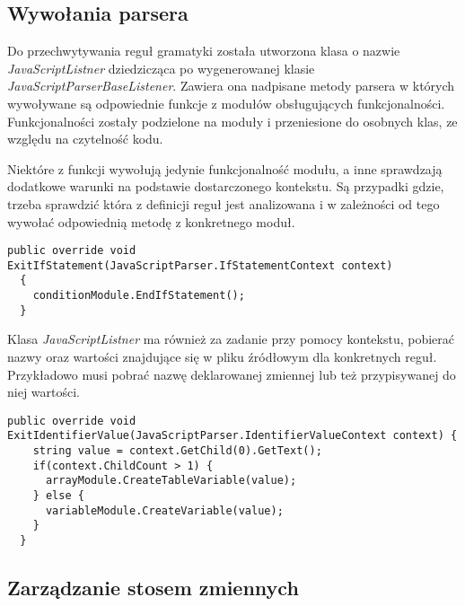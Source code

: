 \subsection{Wywołania parsera}

Do przechwytywania reguł gramatyki została utworzona klasa o nazwie \textit{JavaScriptListner} dziedzicząca po wygenerowanej klasie \textit{JavaScriptParserBaseListener}. Zawiera ona nadpisane metody parsera w których wywoływane są odpowiednie funkcje z modułów obsługujących funkcjonalności. Funkcjonalności zostały podzielone na moduły i przeniesione do osobnych klas, ze względu na czytelność kodu.
\par Niektóre z funkcji wywołują jedynie funkcjonalność modułu, a inne sprawdzają dodatkowe warunki na podstawie dostarczonego kontekstu. Są przypadki gdzie, trzeba sprawdzić która z definicji reguł jest analizowana i w zależności od tego wywołać odpowiednią metodę z konkretnego moduł.

\begin{lstlisting}[language=CSharp, caption=Przykład prostej funkcji listnera, label=alg:komListner1]
  public override void ExitIfStatement(JavaScriptParser.IfStatementContext context)
  {
    conditionModule.EndIfStatement();
  }
\end{lstlisting}

\par Klasa \textit{JavaScriptListner} ma również za zadanie przy pomocy kontekstu, pobierać nazwy oraz wartości znajdujące się w pliku źródłowym dla konkretnych reguł. Przykładowo musi pobrać nazwę deklarowanej zmiennej lub też przypisywanej do niej wartości.

\begin{lstlisting}[language=CSharp, caption=Przykład funkcji listnera z sprawdzeniem kontekstu, label=alg:komListner2]
  public override void ExitIdentifierValue(JavaScriptParser.IdentifierValueContext context) {
    string value = context.GetChild(0).GetText();
    if(context.ChildCount > 1) {
      arrayModule.CreateTableVariable(value);
    } else {
      variableModule.CreateVariable(value);
    }
  }
\end{lstlisting}

\subsection{Zarządzanie stosem zmiennych}

